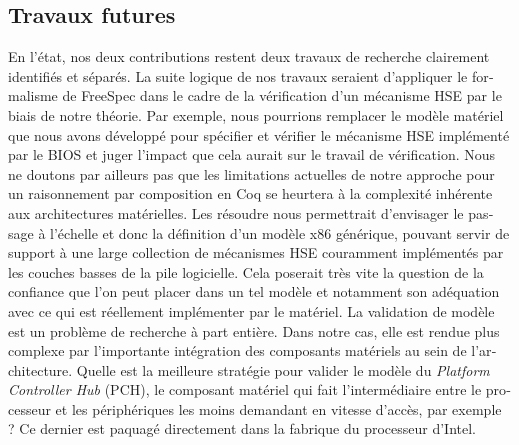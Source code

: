 \begin{otherlanguage}{french}
  \subsection*{Travaux futures}

  En l’état, nos deux contributions restent deux travaux de recherche clairement
  identifiés et séparés.
  La suite logique de nos travaux seraient d’appliquer le formalisme de FreeSpec
  dans le cadre de la vérification d’un mécanisme HSE par le biais de notre
  théorie.
  Par exemple, nous pourrions remplacer le modèle matériel que nous avons
  développé pour spécifier et vérifier le mécanisme HSE implémenté par le BIOS
  et juger l’impact que cela aurait sur le travail de vérification.
  Nous ne doutons par ailleurs pas que les limitations actuelles de notre
  approche pour un raisonnement par composition en Coq se heurtera à la
  complexité inhérente aux architectures matérielles.
  Les résoudre nous permettrait d’envisager le passage à l’échelle et donc la
  définition d’un modèle x86 générique, pouvant servir de support à une large
  collection de mécanismes HSE couramment implémentés par les couches basses de
  la pile logicielle.
  Cela poserait très vite la question de la confiance que l’on peut placer dans
  un tel modèle et notamment son adéquation avec ce qui est réellement
  implémenter par le matériel.
  La validation de modèle est un problème de recherche à part entière.
  Dans notre cas, elle est rendue plus complexe par l’importante intégration des
  composants matériels au sein de l’architecture.
  Quelle est la meilleure stratégie pour valider le modèle du \emph{Platform
    Controller Hub} (PCH), le composant matériel qui fait l’intermédiaire entre
  le processeur et les périphériques les moins demandant en vitesse d’accès, par
  exemple ?
  Ce dernier est paquagé directement dans la fabrique du processeur d’Intel.
\end{otherlanguage}
